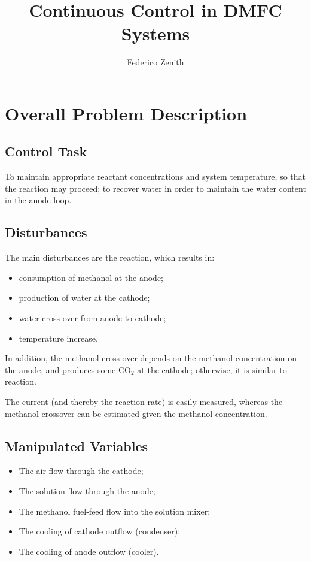 \documentclass[a4paper,10pt]{article}
\title{Continuous Control in DMFC Systems}
\author{Federico Zenith}
\newcommand{\COO}{\ensuremath{\mathrm{CO_2}}}
\begin{document}
\maketitle

\section{Overall Problem Description}

\subsection{Control Task}
To maintain appropriate reactant concentrations and system temperature, so that
the reaction may proceed; to recover water in order to maintain the water
content in the anode loop.

\subsection{Disturbances}
The main disturbances are the reaction, which results in:
\begin{itemize}
\item consumption of methanol at the anode;
\item production of water at the cathode;
\item water cross-over from anode to cathode;
\item temperature increase.
\end{itemize}

In addition, the methanol cross-over depends on the methanol concentration on
the anode, and produces some \COO{} at the cathode; otherwise, it is similar to
reaction.

The current (and thereby the reaction rate) is easily measured, whereas the
methanol crossover can be estimated given the methanol concentration.

\subsection{Manipulated Variables}
\begin{itemize}
\item The air flow through the cathode;
\item The solution flow through the anode;
\item The methanol fuel-feed flow into the solution mixer;
\item The cooling of cathode outflow (condenser);
\item The cooling of anode outflow (cooler).
\end{itemize}
\end{document}
